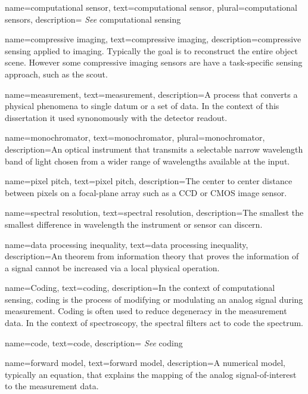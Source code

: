 {
name={computational sensor},
text={computational sensor},
plural={computational sensors},
description={ \emph{See} \gls{computational sensing}}
}


{
name={compressive imaging},
text={compressive imaging},
description={\gls{compressive sensing} applied to imaging. Typically the goal is to reconstruct the entire object scene. However some compressive imaging sensors are have a task-specific sensing approach, such as the \gls{scout}.}
}

{
name={measurement},
text={measurement},
description={A process that converts a physical phenomena to single datum or a set of data. In the context of this dissertation it used synonomously with the detector readout.}
}

{
name={monochromator},
text={monochromator},
plural={monochromator},
description={An optical instrument that transmits a selectable narrow wavelength band of light chosen from a wider range of wavelengths available at the input.}
}

{
name={pixel pitch},
text={pixel pitch},
description={The center to center distance between pixels on a focal-plane array such as a CCD or CMOS image sensor.}
}

{
name={spectral resolution},
text={spectral resolution},
description={The smallest the smallest difference in wavelength the instrument or sensor can discern.}
}

{
name={data processing inequality},
text={data processing inequality},
description={An theorem from information theory that proves the information of a signal cannot be increased via a local physical operation.}
}

{
name={Coding},
text={coding},
description={In the context of computational sensing, coding is the process of modifying or modulating an analog signal during measurement. Coding is often used to reduce degeneracy in the measurement data. In the context of spectroscopy, the spectral filters act to code the spectrum.  }
}

{
name={code},
text={code},
description={ \emph{See} \gls{coding}}
}

{
name={forward model},
text={forward model},
description={A numerical model, typically an equation, that explains the mapping of the analog signal-of-interest to the measurement data.}
}

